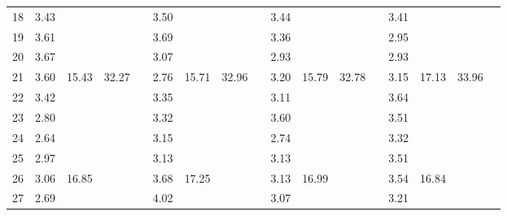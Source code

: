 \begin{center}
\begin{tabular}{| l || c | c | c | c | c | c | c | c | c | c | c | c | c | c | c | c |}
18 & \multirow{1}{*}{ 3.43 }  & & & & \multirow{1}{*}{ 3.50 }  & & & & \multirow{1}{*}{ 3.44 }  & & & & \multirow{1}{*}{ 3.41 }  & & & \\\cline{2-2}\cline{6-6}\cline{10-10}\cline{14-14}
19 & \multirow{1}{*}{ 3.61 }  & & & & \multirow{1}{*}{ 3.69 }  & & & & \multirow{1}{*}{ 3.36 }  & & & & \multirow{1}{*}{ 2.95 }  & & & \\\cline{2-2}\cline{6-6}\cline{10-10}\cline{14-14}
20 & \multirow{1}{*}{ 3.67 }  & & & & \multirow{1}{*}{ 3.07 }  & & & & \multirow{1}{*}{ 2.93 }  & & & & \multirow{1}{*}{ 2.93 }  & & & \\\cline{2-2}\cline{6-6}\cline{10-10}\cline{14-14}\cline{3-3}\cline{7-7}\cline{11-11}\cline{15-15}\cline{4-4}\cline{8-8}\cline{12-12}\cline{16-16}
21 & \multirow{1}{*}{ 3.60 }  & \multirow{5}{*}{ 15.43 }  & \multirow{10}{*}{ 32.27 }  & & \multirow{1}{*}{ 2.76 }  & \multirow{5}{*}{ 15.71 }  & \multirow{10}{*}{ 32.96 }  & & \multirow{1}{*}{ 3.20 }  & \multirow{5}{*}{ 15.79 }  & \multirow{10}{*}{ 32.78 }  & & \multirow{1}{*}{ 3.15 }  & \multirow{5}{*}{ 17.13 }  & \multirow{10}{*}{ 33.96 }  & \\\cline{2-2}\cline{6-6}\cline{10-10}\cline{14-14}
22 & \multirow{1}{*}{ 3.42 }  & & & & \multirow{1}{*}{ 3.35 }  & & & & \multirow{1}{*}{ 3.11 }  & & & & \multirow{1}{*}{ 3.64 }  & & & \\\cline{2-2}\cline{6-6}\cline{10-10}\cline{14-14}
23 & \multirow{1}{*}{ 2.80 }  & & & & \multirow{1}{*}{ 3.32 }  & & & & \multirow{1}{*}{ 3.60 }  & & & & \multirow{1}{*}{ 3.51 }  & & & \\\cline{2-2}\cline{6-6}\cline{10-10}\cline{14-14}
24 & \multirow{1}{*}{ 2.64 }  & & & & \multirow{1}{*}{ 3.15 }  & & & & \multirow{1}{*}{ 2.74 }  & & & & \multirow{1}{*}{ 3.32 }  & & & \\\cline{2-2}\cline{6-6}\cline{10-10}\cline{14-14}
25 & \multirow{1}{*}{ 2.97 }  & & & & \multirow{1}{*}{ 3.13 }  & & & & \multirow{1}{*}{ 3.13 }  & & & & \multirow{1}{*}{ 3.51 }  & & & \\\cline{2-2}\cline{6-6}\cline{10-10}\cline{14-14}\cline{3-3}\cline{7-7}\cline{11-11}\cline{15-15}
26 & \multirow{1}{*}{ 3.06 }  & \multirow{5}{*}{ 16.85 }  & & & \multirow{1}{*}{ 3.68 }  & \multirow{5}{*}{ 17.25 }  & & & \multirow{1}{*}{ 3.13 }  & \multirow{5}{*}{ 16.99 }  & & & \multirow{1}{*}{ 3.54 }  & \multirow{5}{*}{ 16.84 }  & & \\\cline{2-2}\cline{6-6}\cline{10-10}\cline{14-14}
27 & \multirow{1}{*}{ 2.69 }  & & & & \multirow{1}{*}{ 4.02 }  & & & & \multirow{1}{*}{ 3.07 }  & & & & \multirow{1}{*}{ 3.21 }  & & & \\\cline{2-2}\cline{6-6}\cline{10-10}\cline{14-14}

\end{tabular}
\end{center}

